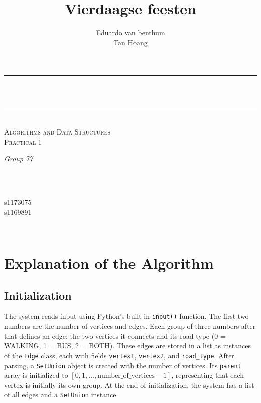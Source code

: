 \documentclass[a4paper]{article}
\title{Vierdaagse feesten}
\author{Eduardo van benthum \\ Tan Hoang}
\makeatletter
\let\thetitle\@title
\let\theauthor\@author
\makeatother
\begin{document}
\begin{center}
\rule{\linewidth}{0.2 mm} \\[0.4 cm]
{ \huge \bfseries \thetitle}\\
\rule{\linewidth}{0.2 mm} \\[0.5 cm]
\textsc{\Large Algorithms and Data Structures}\\[0.2 cm]				
\textsc{\large Practical 1}\\[0.5 cm]				

\begin{minipage}{0.4\textwidth}
    \begin{flushleft} \large
        \emph{Group 77}\\
        \theauthor
        \end{flushleft}
        \end{minipage}~
        \begin{minipage}{0.4\textwidth}
        \begin{flushright} \large
        ~\\
        s1173075\\	s1169891
    \end{flushright}
\end{minipage}\\[1 cm]
\end{center}


\section{Explanation of the Algorithm}
\subsection{Initialization}
The system reads input using Python's built-in \texttt{input()} function. The first two numbers are the number of vertices and edges. Each group of three numbers after that defines an edge: the two vertices it connects and its road type (0 = WALKING, 1 = BUS, 2 = BOTH). These edges are stored in a list as instances of the \texttt{Edge} class, each with fields \texttt{vertex1}, \texttt{vertex2}, and \texttt{road\_type}. 
After parsing, a \texttt{SetUnion} object is created with the number of vertices. Its \texttt{parent} array is initialized to \([0, 1, \dots, \text{number\_of\_vertices}-1]\), representing that each vertex is initially its own group.
At the end of initialization, the system has a list of all edges and a \texttt{SetUnion} instance.
\end{document}

